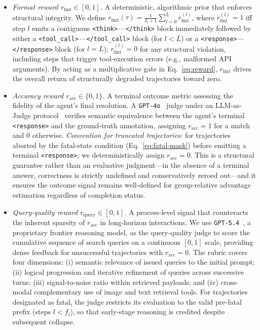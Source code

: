 \begin{itemize}[leftmargin=1.4em, itemsep=4pt, topsep=2pt, parsep=0pt]
  \item \emph{Format reward $r_{\text{fmt}} \in [0,1]$.} A deterministic, algorithmic prior that enforces structural integrity. We define $r_{\text{fmt}}(\tau) = \frac{1}{L+1} \sum_{l=0}^{L} r_{\text{fmt}}^{(l)}$, where $r_{\text{fmt}}^{(l)} = 1$ iff step $l$ emits a contiguous \texttt{<think>}$\,\cdots\,$\texttt{</think>} block immediately followed by either a \texttt{<tool\_call>}$\,\cdots\,$\texttt{</tool\_call>} block (for $l < L$) or a \texttt{<response>}$\,\cdots\,$\texttt{</response>} block (for $l = L$); $r_{\text{fmt}}^{(l)} = 0$ for any structural violation, including steps that trigger tool-execution errors (e.g., malformed API arguments). By acting as a multiplicative gate in Eq.~\ref{eq:reward}, $r_{\text{fmt}}$ drives the overall return of structurally degraded trajectories toward zero.

  \item \emph{Accuracy reward $r_{\text{acc}} \in \{0,1\}$.} A terminal outcome metric assessing the fidelity of the agent's final resolution. A \texttt{GPT-4o}~\citep{openai2024gpt4ocard} judge under an LLM-as-Judge protocol~\citep{gu2025surveyllmasajudge} verifies semantic equivalence between the agent's terminal \texttt{<response>} and the ground-truth annotation, assigning $r_{\text{acc}}=1$ for a match and $0$ otherwise. \emph{Convention for truncated trajectories:} for trajectories aborted by the fatal-state condition (Eq.~\ref{eq:fatal-mask}) before emitting a terminal \texttt{<response>}, we deterministically assign $r_{\text{acc}}=0$. This is a structural guarantee rather than an evaluative judgment---in the absence of a terminal answer, correctness is strictly undefined and conservatively zeroed out---and it ensures the outcome signal remains well-defined for group-relative advantage estimation regardless of completion status.

  \item \emph{Query-quality reward $r_{\text{query}} \in [0,1]$.} A process-level signal that counteracts the inherent sparsity of $r_{\text{acc}}$ in long-horizon interactions. We use \texttt{GPT-5.4}~\citep{GPT-5}, a proprietary frontier reasoning model, as the query-quality judge to score the cumulative sequence of search queries on a continuous $[0,1]$ scale, providing dense feedback for unsuccessful trajectories with $r_{\text{acc}}=0$. The rubric covers four dimensions: (i) semantic relevance of issued queries to the initial prompt; (ii) logical progression and iterative refinement of queries across successive turns; (iii) signal-to-noise ratio within retrieved payloads; and (iv) cross-modal complementary use of image and text retrieval tools. For trajectories designated as fatal, the judge restricts its evaluation to the valid pre-fatal prefix (steps $l < f_i$), so that early-stage reasoning is credited despite subsequent collapse.
\end{itemize}


